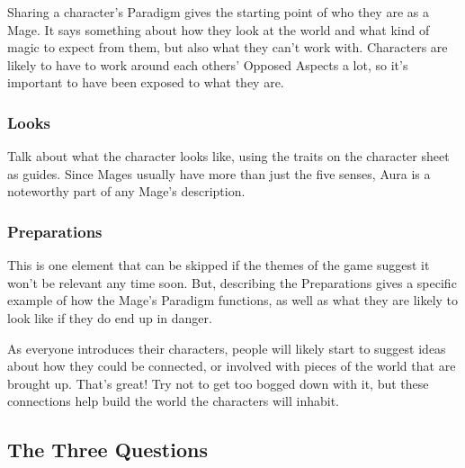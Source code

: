 \documentclass[
  oneside,
  statementpaper,
  9pt]{memoir}
\begin{document}
\begin{Player}

Sharing a character’s Paradigm gives the starting point of who they are as a Mage. It says something about how they look at the world and what kind of magic to expect from them, but also what they can’t work with. Characters are likely to have to work around each others’ Opposed Aspects a lot, so it’s important to have been exposed to what they are.

\end{Player}

\hypertarget{looks}{%
\subsubsection{Looks}\label{looks}}

\begin{Player}

Talk about what the character looks like, using the traits on the character sheet as guides. Since Mages usually have more than just the five senses, Aura is a noteworthy part of any Mage’s description.

\end{Player}

\hypertarget{preparations}{%
\subsubsection{Preparations}\label{preparations}}

\begin{Player}

This is one element that can be skipped if the themes of the game suggest it won’t be relevant any time soon. But, describing the Preparations gives a specific example of how the Mage’s Paradigm functions, as well as what they are likely to look like if they do end up in danger.

As everyone introduces their characters, people will likely start to suggest ideas about how they could be connected, or involved with pieces of the world that are brought up. That’s great! Try not to get too bogged down with it, but these connections help build the world the characters will inhabit.

\end{Player}

\hypertarget{the-three-questions}{%
\subsection{The Three Questions}\label{the-three-questions}}
\end{document}
